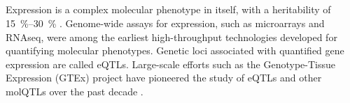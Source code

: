 \begin{outline}
\subsection{}

Expression is a complex molecular phenotype in itself, with a heritability of \SIrange{15}{30}{\percent} \autocite{gaffney2013GlobalPropertiesFunctional}.
Genome-wide assays for expression, such as microarrays and \gls{RNAseq}, were among the earliest high-throughput technologies developed for quantifying molecular phenotypes.
Genetic loci associated with quantified gene expression are called \glspl{eQTL}.
Large-scale efforts such as the Genotype-Tissue Expression (GTEx) project \autocite{thegtexconsortium2020GTExConsortiumAtlas} have pioneered the study of \glspl{eQTL} and other \glspl{molQTL} over the past decade \autocite{vandiedonck2017GeneticAssociationMolecular}.


\end{outline}
